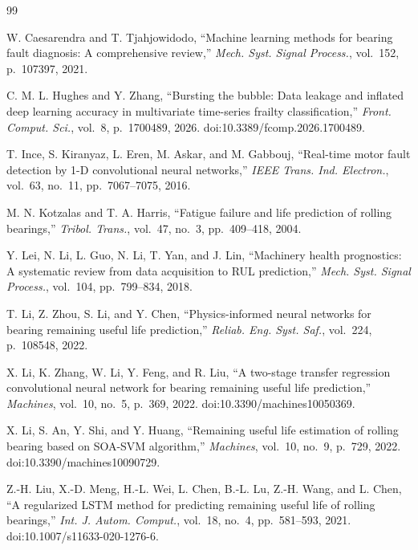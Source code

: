 \documentclass[pdflatex,sn-basic,NameDate]{sn-jnl}
\begin{document}
\begin{thebibliography}{99}

W. Caesarendra and T. Tjahjowidodo,
``Machine learning methods for bearing fault diagnosis: A comprehensive review,''
\textit{Mech. Syst. Signal Process.}, vol.~152, p.~107397, 2021.

C. M. L. Hughes and Y. Zhang,
``Bursting the bubble: Data leakage and inflated deep learning accuracy in multivariate time-series frailty classification,''
\textit{Front. Comput. Sci.}, vol.~8, p.~1700489, 2026. doi:10.3389/fcomp.2026.1700489.

T. Ince, S. Kiranyaz, L. Eren, M. Askar, and M. Gabbouj,
``Real-time motor fault detection by 1-D convolutional neural networks,''
\textit{IEEE Trans. Ind. Electron.}, vol.~63, no.~11, pp.~7067--7075, 2016.

M. N. Kotzalas and T. A. Harris,
``Fatigue failure and life prediction of rolling bearings,''
\textit{Tribol. Trans.}, vol.~47, no.~3, pp.~409--418, 2004.

Y. Lei, N. Li, L. Guo, N. Li, T. Yan, and J. Lin,
``Machinery health prognostics: A systematic review from data acquisition to RUL prediction,''
\textit{Mech. Syst. Signal Process.}, vol.~104, pp.~799--834, 2018.

T. Li, Z. Zhou, S. Li, and Y. Chen,
``Physics-informed neural networks for bearing remaining useful life prediction,''
\textit{Reliab. Eng. Syst. Saf.}, vol.~224, p.~108548, 2022.

X. Li, K. Zhang, W. Li, Y. Feng, and R. Liu,
``A two-stage transfer regression convolutional neural network for bearing remaining useful life prediction,''
\textit{Machines}, vol.~10, no.~5, p.~369, 2022. doi:10.3390/machines10050369.

X. Li, S. An, Y. Shi, and Y. Huang,
``Remaining useful life estimation of rolling bearing based on SOA-SVM algorithm,''
\textit{Machines}, vol.~10, no.~9, p.~729, 2022. doi:10.3390/machines10090729.

Z.-H. Liu, X.-D. Meng, H.-L. Wei, L. Chen, B.-L. Lu, Z.-H. Wang, and L. Chen,
``A regularized LSTM method for predicting remaining useful life of rolling bearings,''
\textit{Int. J. Autom. Comput.}, vol.~18, no.~4, pp.~581--593, 2021. doi:10.1007/s11633-020-1276-6.


\end{thebibliography}
\end{document}
